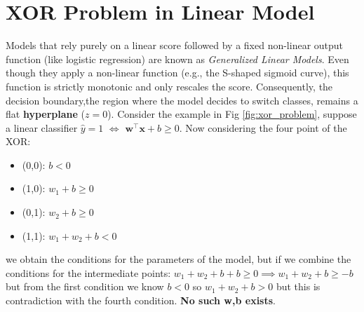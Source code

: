 \section{XOR Problem in Linear Model}
Models that rely purely on a linear score followed by a fixed non-linear output function 
(like logistic regression) are known as \textit{Generalized Linear Models}. Even though they apply 
a non-linear function (e.g., the S-shaped sigmoid curve), this function is strictly 
monotonic and only rescales the score. Consequently, the decision boundary,the region where the 
model decides to switch classes, remains a flat \textbf{hyperplane} ($z = 0$).
\newline
Consider the example in Fig \ref{fig:xor_problem}, suppose a linear
classifier $\hat{y} = 1$ $\iff$ $\mathbf{w}^{\top}\mathbf{x} + b \geq 0$. Now considering the four point
of the XOR:
\begin{itemize}
    \item (0,0): $b < 0$
    \item (1,0): $w_1 + b \geq 0$
    \item (0,1): $w_2 + b \geq 0$
    \item (1,1): $w_1 + w_2 + b < 0$
\end{itemize} 
we obtain the conditions for the parameters of the model, but if we combine the conditions for the intermediate
points: $w_1 + w_2 + b + b \geq 0 \implies w_1 + w_2 + b \geq -b$ but from the first condition we know
$b < 0$ so $w_1 + w_2 + b > 0$ but this is contradiction with the fourth condition. \textbf{No such w,b exists}.

